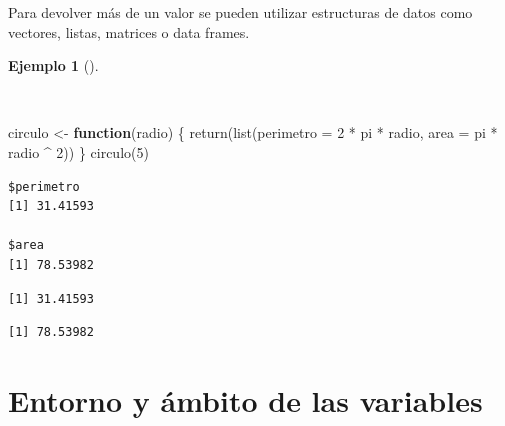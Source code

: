 \documentclass[
  a4paper,
]{scrreport}
\newenvironment{Shaded}{\begin{snugshade}}{\end{snugshade}}
\newcommand{\AttributeTok}[1]{\textcolor[rgb]{0.40,0.45,0.13}{#1}}
\newcommand{\ControlFlowTok}[1]{\textcolor[rgb]{0.00,0.23,0.31}{\textbf{#1}}}
\newcommand{\DecValTok}[1]{\textcolor[rgb]{0.68,0.00,0.00}{#1}}
\newcommand{\FunctionTok}[1]{\textcolor[rgb]{0.28,0.35,0.67}{#1}}
\newcommand{\NormalTok}[1]{\textcolor[rgb]{0.00,0.23,0.31}{#1}}
\newcommand{\OtherTok}[1]{\textcolor[rgb]{0.00,0.23,0.31}{#1}}
\newcommand{\SpecialCharTok}[1]{\textcolor[rgb]{0.37,0.37,0.37}{#1}}
\theoremstyle{definition}
\theoremstyle{definition}
\newtheorem{example}{Ejemplo}[chapter]
\theoremstyle{remark}
\begin{document}
Para devolver más de un valor se pueden utilizar estructuras de datos
como vectores, listas, matrices o data frames.

\begin{example}[]\protect\hypertarget{exm-retorno-funcion-lista}{}\label{exm-retorno-funcion-lista}

~

\begin{Shaded}
\begin{Highlighting}[]
\NormalTok{circulo }\OtherTok{\textless{}{-}} \ControlFlowTok{function}\NormalTok{(radio) \{}
  \FunctionTok{return}\NormalTok{(}\FunctionTok{list}\NormalTok{(}\AttributeTok{perimetro =} \DecValTok{2} \SpecialCharTok{*}\NormalTok{ pi }\SpecialCharTok{*}\NormalTok{ radio, }\AttributeTok{area =}\NormalTok{ pi }\SpecialCharTok{*}\NormalTok{ radio }\SpecialCharTok{\^{}} \DecValTok{2}\NormalTok{))}
\NormalTok{\}}
\FunctionTok{circulo}\NormalTok{(}\DecValTok{5}\NormalTok{)}
\end{Highlighting}
\end{Shaded}

\begin{verbatim}
$perimetro
[1] 31.41593

$area
[1] 78.53982
\end{verbatim}

\begin{Shaded}
\end{Shaded}

\begin{verbatim}
[1] 31.41593
\end{verbatim}

\begin{Shaded}
\end{Shaded}

\begin{verbatim}
[1] 78.53982
\end{verbatim}

\end{example}

\section{Entorno y ámbito de las
variables}\label{entorno-y-uxe1mbito-de-las-variables}
\end{document}
